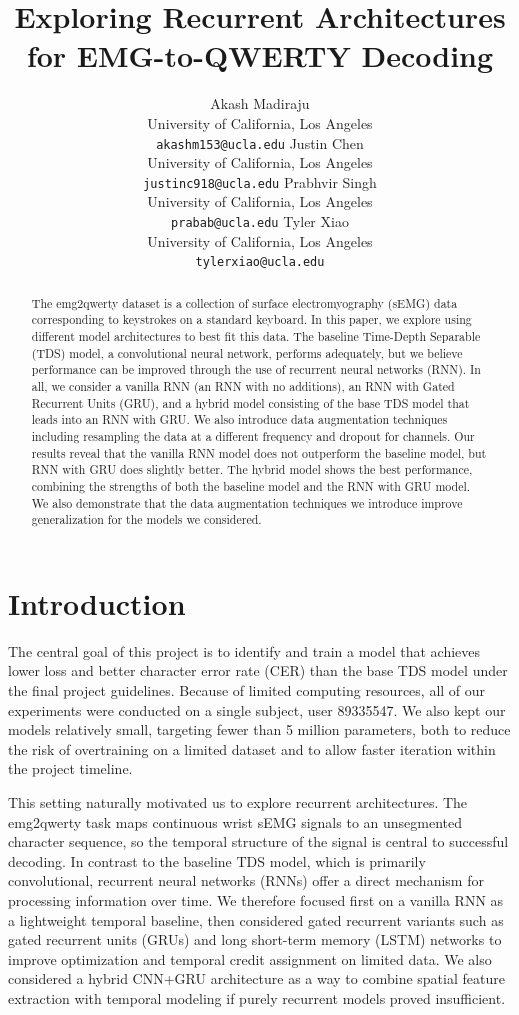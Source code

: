 \documentclass{article}
\title{Exploring Recurrent Architectures for EMG-to-QWERTY Decoding}
\author{%
  Akash Madiraju \\
  University of California, Los Angeles \\
  \texttt{akashm153@ucla.edu}
  \And
  Justin Chen \\
  University of California, Los Angeles \\
  \texttt{justinc918@ucla.edu}
  \And
  Prabhvir Singh \\
  University of California, Los Angeles \\
  \texttt{prabab@ucla.edu}
  \And
  Tyler Xiao \\
  University of California, Los Angeles \\
  \texttt{tylerxiao@ucla.edu}
}
\begin{document}
\maketitle

\begin{abstract}
  The emg2qwerty dataset is a collection of surface electromyography (sEMG) data 
  corresponding to keystrokes on a standard keyboard. In this paper, we explore 
  using different model architectures to best fit this data. The baseline Time-Depth 
  Separable (TDS) model, a convolutional neural network, performs adequately, but we 
  believe performance can be improved through the use of recurrent neural networks (RNN). 
  In all, we consider a vanilla RNN (an RNN with no additions), an RNN with Gated Recurrent 
  Units (GRU), and a hybrid model consisting of the base TDS model that leads into an RNN with 
  GRU. We also introduce data augmentation techniques including resampling the data at a 
  different frequency and dropout for channels. Our results reveal that the vanilla RNN 
  model does not outperform the baseline model, but RNN with GRU does slightly better. 
  The hybrid model shows the best performance, combining the strengths of both the 
  baseline model and the RNN with GRU model. We also demonstrate that the data 
  augmentation techniques we introduce improve generalization for the models we considered.
\end{abstract}

\section{Introduction}

The central goal of this project is to identify and train a model that achieves
lower loss and better character error rate (CER) than the base TDS model under
the final project guidelines. Because of limited computing resources, all of
our experiments were conducted on a single subject, user 89335547. We also kept
our models relatively small, targeting fewer than 5 million parameters, both to
reduce the risk of overtraining on a limited dataset and to allow faster
iteration within the project timeline.

This setting naturally motivated us to explore recurrent architectures. The
emg2qwerty task maps continuous wrist sEMG signals to an unsegmented character
sequence, so the temporal structure of the signal is central to successful
decoding. In contrast to the baseline TDS model, which is primarily
convolutional, recurrent neural networks (RNNs) offer a direct mechanism for
processing information over time. We therefore focused first on a vanilla RNN
as a lightweight temporal baseline, then considered gated recurrent variants
such as gated recurrent units (GRUs) and long short-term memory (LSTM) networks
to improve optimization and temporal credit assignment on limited data. We also
considered a hybrid CNN+GRU architecture as a way to combine spatial feature
extraction with temporal modeling if purely recurrent models proved
insufficient.
\end{document}

